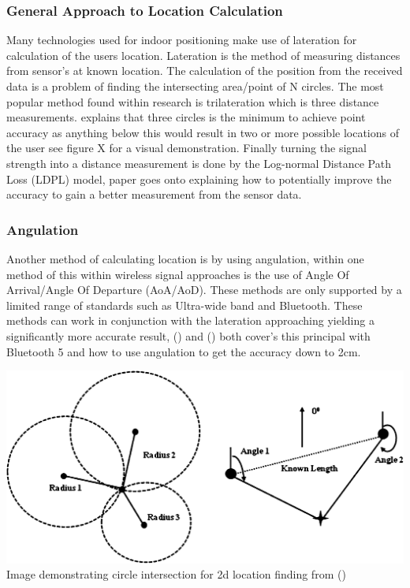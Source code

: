 \subsubsection{General Approach to Location Calculation}
Many technologies used for indoor positioning make use of lateration for calculation of the users location. Lateration is the method of measuring distances from sensor's at known location. The calculation of the position from the received data is a problem of finding the intersecting area/point of N circles. The most popular method found within research is trilateration which is three distance measurements. \cite{shchekotov_2015_indoor} explains that three circles is the minimum to achieve point accuracy as anything below this would result in two or more possible locations of the user see figure X for a visual demonstration. Finally turning the signal strength into a distance measurement is done by the Log-normal Distance Path Loss (LDPL) model, \cite{yang_2018_an} paper goes onto explaining how to potentially improve the accuracy to gain a better measurement from the sensor data.
 
\subsubsection{Angulation}
Another method of calculating location is by using angulation, within one method of this within wireless signal approaches is the use of Angle Of Arrival/Angle Of Departure (AoA/AoD). These methods are only supported by a limited range of standards such as Ultra-wide band and Bluetooth. These methods can work in conjunction with the lateration approaching yielding a significantly more accurate result, (\cite{mysticmedia_2020_the}) and (\cite{lehtimki_bluetooth}) both cover's this principal with Bluetooth 5 and how to use angulation to get the accuracy down to 2cm.


\begin{center}
	\includegraphics[width=\linewidth]{images/research/distanceandaoa.png}\\
	Image demonstrating circle intersection for 2d location finding from (\cite{kim_2013_rfidbased})
\end{center}

